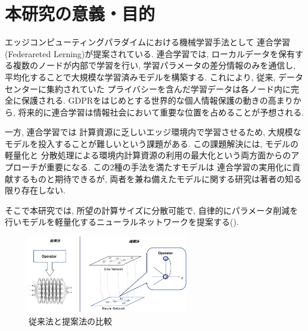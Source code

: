 \documentclass[a4paper, 9pt,twocolumn,dvipdfmx]{jsarticle}
\begin{document}

\graphicspath{{./figs/}} %

\section{本研究の意義・目的}

エッジコンピューティングパラダイムにおける機械学習手法として
連合学習(Federareted Lerning)が提案されている\cite{DFL}.
連合学習では, 
ローカルデータを保有する複数のノードが内部で学習を行い, 
学習パラメータの差分情報のみを通信し, 
平均化することで大規模な学習済みモデルを構築する.
これにより, 従来, データセンターに集約されていた
プライバシーを含んだ学習データは各ノード内に完全に保護される.
GDPRをはじめとする世界的な個人情報保護の動きの高まりから, 
将来的に連合学習は情報社会において重要な位置を占めることが予想される.

一方, 連合学習では
計算資源に乏しいエッジ環境内で学習させるため, 
大規模なモデルを投入することが難しいという課題がある.
この課題解決には, モデルの軽量化と
分散処理による環境内計算資源の利用の最大化という両方面からのアプローチが重要になる.
この2種の手法を満たすモデルは
連合学習の実用化に貢献するものと期待できるが, 
両者を兼ね備えたモデルに関する研究は著者の知る限り存在しない. 

そこで本研究では,  
所望の計算サイズに分散可能で, 
自律的にパラメータ削減を行いモデルを軽量化するニューラルネットワークを提案する().
\vspace{-1.5zh}
\begin{figure}[H]
  \centering
  \includegraphics[width=7cm]{ThisModel.pdf}
  \caption{従来法と提案法の比較}
  \label{fig:ThisModel}
\end{figure}
\vspace{-3zh}
\end{document}
